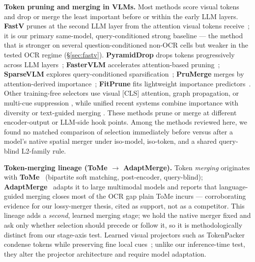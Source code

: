 \documentclass[sigconf,nonacm]{acmart}
\begin{document}
\textbf{Token pruning and merging in VLMs.} Most methods score visual tokens and
drop or merge the least important before or within the early LLM layers.
\textbf{FastV} prunes at the second LLM layer from the attention visual tokens
receive~\cite{chen2024fastv}; it is our primary same-model, query-conditioned
strong baseline --- the method that is stronger on several question-conditioned
non-OCR cells but weaker in the tested OCR regime (\S\ref{sec:fastv}).
\textbf{PyramidDrop} drops tokens progressively across LLM
layers~\cite{xing2024pyramiddrop}; \textbf{FasterVLM} accelerates
attention-based pruning~\cite{zhang2024fastervlm}; \textbf{SparseVLM} explores
query-conditioned sparsification~\cite{zhang2024sparsevlm}; \textbf{PruMerge}
merges by attention-derived importance~\cite{shang2024prumerge};
\textbf{FitPrune} fits lightweight importance
predictors~\cite{ye2024fitprune}. Other training-free selectors use visual
{[CLS]} attention, graph propagation, or multi-cue suppression
\cite{wang2024vtccls,jiang2025gprune,luan2025adaptprune}, while unified recent
systems combine importance with diversity or text-guided merging
\cite{yu2026visiontrim,baek2026agilepruner,fang2026prunesid}. These methods
prune or merge at different
encoder-output or LLM-side hook points. Among the methods reviewed here, we
found no matched comparison of selection immediately before versus after a
model's native spatial merger under iso-model, iso-token, and a shared
query-blind L2-family rule.

\textbf{Token-merging lineage (ToMe $\to$ AdaptMerge).} Token \emph{merging}
originates with \textbf{ToMe}~\cite{bolya2023tome} (bipartite soft matching,
post-encoder, query-blind); \textbf{AdaptMerge}~\cite{islam2025adaptmerge}
adapts it to large multimodal models and reports that language-guided merging
closes most of the OCR gap plain ToMe incurs --- corroborating evidence for our
lossy-merger thesis, cited as support, not as a competitor. This lineage adds a
\emph{second}, learned merging stage; we hold the native merger fixed and ask
only whether selection should precede or follow it, so it is methodologically
distinct from our stage-axis test.
Learned visual projectors such as TokenPacker condense tokens while preserving
fine local cues~\cite{li2024tokenpacker}; unlike our inference-time test, they
alter the projector architecture and require model adaptation.
\end{document}
